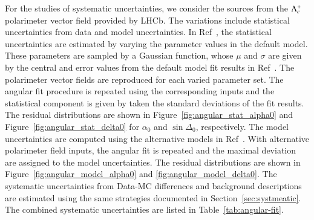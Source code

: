 For the studies of systematic uncertainties, we consider the sources from the $\Lambda_{c}^{+}$ polarimeter vector field provided by LHCb. The variations include statistical uncertainties from data and model uncertainties. In Ref~\cite{LHCb:2023crj}, the statistical uncertainties are estimated by varying the parameter values in the default model. These parameters are sampled by a Gaussian function, whose $\mu$ and $\sigma$ are given by the central and error values from the default model fit results in Ref~\cite{LHCb:2022ouv}. The polarimeter vector fields are reproduced for each varied parameter set. The angular fit procedure is repeated using the corresponding inputs and the statistical component is given by taken the standard deviations of the fit results. The residual distributions are shown in Figure~\ref{fig:angular_stat_alpha0} and Figure~\ref{fig:angular_stat_delta0} for $\alpha_0$ and $\sin\Delta_0$, respectively. The model uncertainties are computed using the alternative models in Ref~\cite{LHCb:2022ouv}. With alternative polarimeter field inputs, the angular fit is repeated and the maximal deviation are assigned to the model uncertainties. 
The residual distributions are shown in Figure~\ref{fig:angular_model_alpha0} and \ref{fig:angular_model_delta0}.
The systematic uncertainties from Data-MC differences and background descriptions are estimated using the same strategies documented in Section~\ref{sec:systmeatic}. The combined systematic uncertainties are listed in Table~\ref{tab:angular-fit}.

